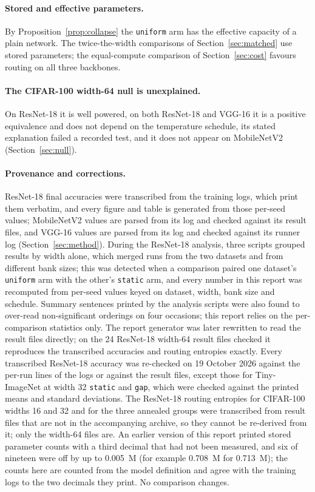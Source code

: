 \documentclass[10pt,a4paper]{article}
\begin{document}
\paragraph{Stored and effective parameters.} By
Proposition~\ref{prop:collapse} the \texttt{uniform} arm has the effective
capacity of a plain network. The twice-the-width comparisons of
Section~\ref{sec:matched} use stored parameters; the equal-compute
comparison of Section~\ref{sec:cost} favours routing on all three
backbones.

\paragraph{The CIFAR-100 width-64 null is unexplained.} On ResNet-18 it is
well powered, on both ResNet-18 and VGG-16 it is a positive equivalence
and does not depend on the temperature schedule, its stated explanation
failed a recorded test, and it does not appear on MobileNetV2
(Section~\ref{sec:null}).

\paragraph{Provenance and corrections.} ResNet-18 final accuracies were
transcribed from the training logs, which print them verbatim, and every
figure and table is generated from those per-seed values; MobileNetV2
values are parsed from its log and checked against its result files, and
VGG-16 values are parsed from its log and checked against its runner log
(Section~\ref{sec:method}). During the ResNet-18 analysis, three scripts
grouped results by width alone, which merged runs from the two datasets and
from different bank sizes; this was detected when a comparison paired one
dataset's \texttt{uniform} arm with the other's \texttt{static} arm, and
every number in this report was recomputed from per-seed values keyed on
dataset, width, bank size and schedule. Summary sentences printed by the
analysis scripts were also found to over-read non-significant orderings on
four occasions; this report relies on the per-comparison statistics only.
The report generator was later rewritten to read the result files
directly; on the 24 ResNet-18 width-64 result files checked it reproduces
the transcribed accuracies and routing entropies exactly. Every
transcribed ResNet-18 accuracy was re-checked on 19 October 2026 against
the per-run lines of the logs or against the result files, except those
for Tiny-ImageNet at width 32 \texttt{static} and \texttt{gap}, which were
checked against the printed means and standard deviations. The ResNet-18
routing entropies for CIFAR-100 widths 16 and 32 and for the three annealed
groups were transcribed from result files that are not in the
accompanying archive, so they cannot be re-derived from it; only the
width-64 files are. An earlier version of this report printed stored
parameter counts with a third decimal that had not been measured, and six
of nineteen were off by up to \SI{0.005}{M} (for example \SI{0.708}{M} for
\SI{0.713}{M}); the counts here are counted from the model definition and
agree with the training logs to the two decimals they print. No comparison
changes.
\end{document}
